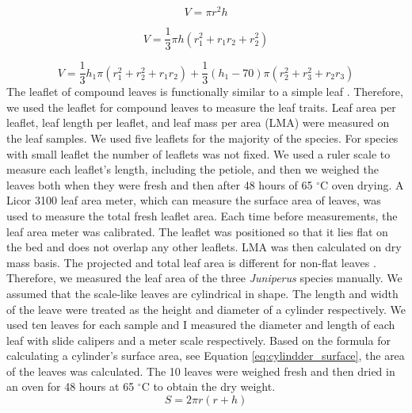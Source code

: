 \documentclass{bmcart}
\begin{document}
\begin{equation}
\label{eq:volume_of_cylinder}
V = \pi r^2h
\end{equation}


\begin{equation}
\label{eq:truncated_cone}
V = \frac{1}{3}\pi h(r_1^2 + r_1r_2 + r_2^2)
\end{equation}

\begin{equation}
\label{eq:double_truncated_cone}
V = \frac{1}{3}h_1 \pi( r_{1}^2 +  r_{2}^2 +  r_{1} r_{2}) + \frac{1}{3}(h_1 - 70) \pi (r_{2}^2 +  r_{3}^2 +  r_{2} r_{3})
\end{equation}
The leaflet of compound leaves is functionally similar to a simple leaf
\citep{perez2016corrigendum}. Therefore, we used the leaflet for compound leaves to measure the leaf traits. Leaf area per leaflet, leaf length per leaflet, and leaf mass per area (LMA) were measured on the leaf samples. We used five leaflets for the majority of the species. For species with small leaflet the number of leaflets was not fixed. We used a ruler scale to measure each leaflet's length, including the petiole, and then we weighed the leaves both when they were fresh and then after 48 hours of 65 $^{\circ}$C oven drying. A Licor 3100 leaf area meter, which can measure the surface area of leaves, was used to measure the total fresh leaflet area. Each time before measurements, the leaf area meter was calibrated. The leaflet was positioned so that it lies flat on the bed and does not overlap any other leaflets.   
LMA was then calculated on  dry mass basis. The projected and total leaf area is different for non-flat leaves \citep{perez2016corrigendum, cornelissen2003handbook}. Therefore, we measured the leaf area of the three \emph{Juniperus} species manually. We assumed that the scale-like leaves are cylindrical in shape. The length and width of the leave were treated as the height and diameter of a cylinder respectively. We used ten leaves for each sample and I measured the diameter and length of each leaf with slide calipers and a meter scale respectively. Based on the formula for calculating a cylinder's surface area, see Equation \eqref{eq:cylindder_surface}, the area of the leaves was calculated. The 10 leaves were weighed fresh and then dried in an oven for 48 hours at 65 $^{\circ}$C to obtain the dry weight.
\begin{equation}
\label{eq:cylindder_surface}
S = 2\pi r(r+h)
\end{equation}
\end{document}

